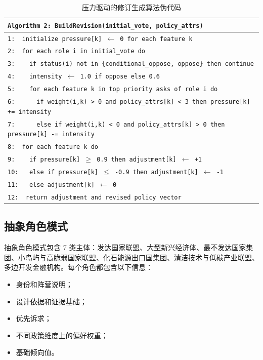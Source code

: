 \documentclass[12pt,a4paper]{ctexart}
\begin{document}
\begin{table}[H]
\centering
\caption{压力驱动的修订生成算法伪代码}
\label{tab:algo-revision}
\begin{tabularx}{\textwidth}{X}
\toprule
\texttt{Algorithm 2: BuildRevision(initial\_vote, policy\_attrs)} \\
\midrule
\texttt{1:\ \ initialize pressure[k] $\leftarrow$ 0 for each feature k} \\
\texttt{2:\ \ for each role i in initial\_vote do} \\
\texttt{3:\ \ \ \ if status(i) not in \{conditional\_oppose, oppose\} then continue} \\
\texttt{4:\ \ \ \ intensity $\leftarrow$ 1.0 if oppose else 0.6} \\
\texttt{5:\ \ \ \ for each feature k in top priority asks of role i do} \\
\texttt{6:\ \ \ \ \ \ if weight(i,k) > 0 and policy\_attrs[k] < 3 then pressure[k] += intensity} \\
\texttt{7:\ \ \ \ \ \ else if weight(i,k) < 0 and policy\_attrs[k] > 0 then pressure[k] -= intensity} \\
\texttt{8:\ \ for each feature k do} \\
\texttt{9:\ \ \ \ if pressure[k] $\ge$ 0.9 then adjustment[k] $\leftarrow$ +1} \\
\texttt{10:\ \ \ else if pressure[k] $\le$ -0.9 then adjustment[k] $\leftarrow$ -1} \\
\texttt{11:\ \ \ else adjustment[k] $\leftarrow$ 0} \\
\texttt{12:\ \ return adjustment and revised policy vector} \\
\bottomrule
\end{tabularx}
\end{table}

\subsection{抽象角色模式}
抽象角色模式包含 7 类主体：发达国家联盟、大型新兴经济体、最不发达国家集团、小岛屿与高脆弱国家联盟、化石能源出口国集团、清洁技术与低碳产业联盟、多边开发金融机构。每个角色都包含以下信息：
\begin{itemize}
  \item 身份和阵营说明；
  \item 设计依据和证据基础；
  \item 优先诉求；
  \item 不同政策维度上的偏好权重；
  \item 基础倾向值。
\end{itemize}
\end{document}
